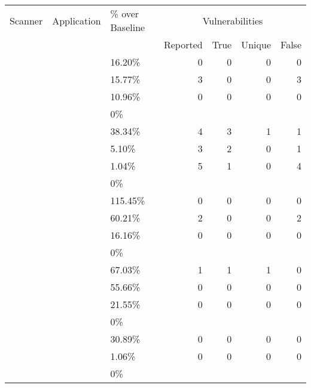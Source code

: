 \begin{table*}[tb]
  \small
  \centering
  \begin{tabular}{lll|rrrr}
\hline
 Scanner   &  Application    &  \% over Baseline  & \multicolumn{4}{c}{Vulnerabilities}  \\
             &               &                    &  Reported & True & Unique & False \\     
\hline
 \crawler{}   &  \gallery{}        &  16.20\%           & 0 & 0 & 0 & 0 \\
 \waf{}      &  \gallery{}        &  15.77\%           & 3 & 0 & 0 & 3 \\
 \skipfish{}  &  \gallery{}        &  10.96\%           & 0 & 0 & 0 & 0 \\
 \wget{}      &  \gallery{}        &  0\%                & & & & \\
\hline
 \crawler{}   &  \phpbbtwo{}         &  38.34\%           & 4 & 3 & 1 & 1 \\
 \skipfish{}  &  \phpbbtwo{}         &  5.10\%            & 3 & 2 & 0 & 1 \\
 \waf{}      &  \phpbbtwo{}         &  1.04\%            & 5 & 1 & 0 & 4 \\
 \wget{}      &  \phpbbtwo{}         &  0\%                & & & & \\
\hline
 \crawler{}   &  \phpbbthree{}         &  115.45\%          & 0 & 0 &0 & 0 \\
 \skipfish{}  &  \phpbbthree{}         &  60.21\%           & 2 & 0 &0 & 2 \\
 \waf{}      &  \phpbbthree{}         &  16.16\%           & 0 & 0 &0 & 0 \\
 \wget{}      &  \phpbbthree{}         &  0\%                & & & & \\
\hline
 \crawler{}   &  \scarf{}          &  67.03\%           & 1 & 1 & 1 & 0 \\
 \skipfish{}  &  \scarf{}          &  55.66\%           & 0 & 0 & 0 & 0 \\
 \waf{}      &  \scarf{}          &  21.55\%           & 0 & 0 & 0 & 0 \\
 \wget{}      &  \scarf{}          &  0\%                & & & & \\
\hline
 \crawler{}   &  \vanillaforums{}  &  30.89\%           & 0 & 0 & 0 & 0 \\
 \waf{}      &  \vanillaforums{}  &  1.06\%            & 0 & 0 & 0& 0 \\
 \wget{}      &  \vanillaforums{}  &  0\%                & & & & \\

\end{tabular}
\end{table*}
